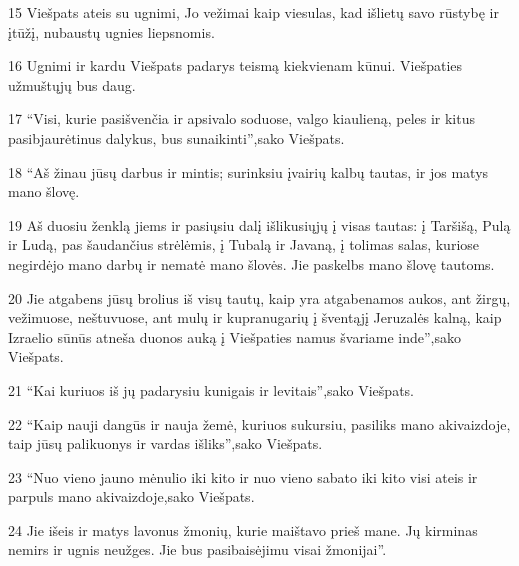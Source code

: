 \par 15 Viešpats ateis su ugnimi, Jo vežimai kaip viesulas, kad išlietų savo rūstybę ir įtūžį, nubaustų ugnies liepsnomis. 
\par 16 Ugnimi ir kardu Viešpats padarys teismą kiekvienam kūnui. Viešpaties užmuštųjų bus daug. 
\par 17 “Visi, kurie pasišvenčia ir apsivalo soduose, valgo kiaulieną, peles ir kitus pasibjaurėtinus dalykus, bus sunaikinti”,­sako Viešpats. 
\par 18 “Aš žinau jūsų darbus ir mintis; surinksiu įvairių kalbų tautas, ir jos matys mano šlovę. 
\par 19 Aš duosiu ženklą jiems ir pasiųsiu dalį išlikusiųjų į visas tautas: į Taršišą, Pulą ir Ludą, pas šaudančius strėlėmis, į Tubalą ir Javaną, į tolimas salas, kuriose negirdėjo mano darbų ir nematė mano šlovės. Jie paskelbs mano šlovę tautoms. 
\par 20 Jie atgabens jūsų brolius iš visų tautų, kaip yra atgabenamos aukos, ant žirgų, vežimuose, neštuvuose, ant mulų ir kupranugarių į šventąjį Jeruzalės kalną, kaip Izraelio sūnūs atneša duonos auką į Viešpaties namus švariame inde”,­sako Viešpats. 
\par 21 “Kai kuriuos iš jų padarysiu kunigais ir levitais”,­sako Viešpats. 
\par 22 “Kaip nauji dangūs ir nauja žemė, kuriuos sukursiu, pasiliks mano akivaizdoje, taip jūsų palikuonys ir vardas išliks”,­sako Viešpats. 
\par 23 “Nuo vieno jauno mėnulio iki kito ir nuo vieno sabato iki kito visi ateis ir parpuls mano akivaizdoje,­sako Viešpats.­ 
\par 24 Jie išeis ir matys lavonus žmonių, kurie maištavo prieš mane. Jų kirminas nemirs ir ugnis neužges. Jie bus pasibaisėjimu visai žmonijai”.




